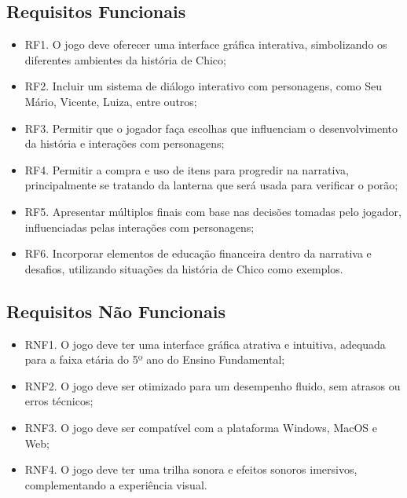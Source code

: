 \subsection*{Requisitos Funcionais}
\begin{itemize}
	\item RF1. O jogo deve oferecer uma interface gráfica interativa, simbolizando os diferentes ambientes da história de Chico;
	\item RF2. Incluir um sistema de diálogo interativo com personagens, como Seu Mário, Vicente, Luiza, entre outros;
	\item RF3. Permitir que o jogador faça escolhas que influenciam o desenvolvimento da história e interações com personagens;
	\item RF4. Permitir a compra e uso de itens para progredir na narrativa, principalmente se tratando da lanterna que será usada para verificar o porão;
	\item RF5. Apresentar múltiplos finais com base nas decisões tomadas pelo jogador, influenciadas pelas interações com personagens;
	\item RF6. Incorporar elementos de educação financeira dentro da narrativa e desafios, utilizando situações da história de Chico como exemplos.
\end{itemize}

\subsection*{Requisitos Não Funcionais}
\begin{itemize}
	\item RNF1. O jogo deve ter uma interface gráfica atrativa e intuitiva, adequada para a faixa etária do 5º ano do Ensino Fundamental;
	\item RNF2. O jogo deve ser otimizado para um desempenho fluido, sem atrasos ou erros técnicos;
	\item RNF3. O jogo deve ser compatível com a plataforma Windows, MacOS e Web;
	\item RNF4. O jogo deve ter uma trilha sonora e efeitos sonoros imersivos, complementando a experiência visual.
\end{itemize}

